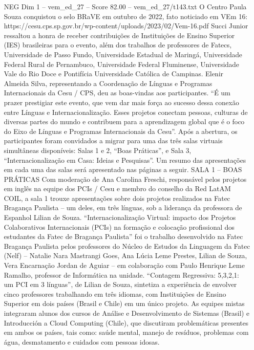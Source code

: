 \begin{textsample}{NEG Dim 1 – vem\_ed\_27 – Score 82.00 – vem\_ed\_27/t143.txt}
O Centro Paula Souza conquistou o selo BRaVE em outubro de 2022, fato noticiado em VEm 16: https://cesu.cps.sp.gov.br/wp-content/uploads/2023/02/Vem-16.pdf Succi Junior ressaltou a honra de receber contribuições de Instituições de Ensino Superior (IES) brasileiras para o evento, além dos trabalhos de professores de Fatecs, Universidade de Passo Fundo, Universidade Estadual de Maringá, Universidade Federal Rural de Pernambuco, Universidade Federal Fluminense, Universidade Vale do Rio Doce e Pontifícia Universidade Católica de Campinas.
Elenir Almeida Silva, representando a Coordenação de Línguas e Programas Internacionais da Cesu / CPS, deu as boas-vindas aos participantes. “É um prazer prestigiar este evento, que vem dar mais força ao sucesso dessa conexão entre Línguas e Internacionalização.
Esses projetos conectam pessoas, culturas de diversas partes do mundo e contribuem para a aprendizagem global que é o foco do Eixo de Línguas e Programas Internacionais da Cesu”.
Após a abertura, os participantes foram convidados a migrar para uma das três salas virtuais simultâneas disponíveis: Salas 1 e 2, “Boas Práticas”, e Sala 3, “Internacionalização em Casa: Ideias e Pesquisas”.
Um resumo das apresentações em cada uma das salas será apresentado nas páginas a seguir.
SALA 1 – BOAS PRÁTICAS Com moderação de Ana Carolina Freschi, responsável pelos projetos em inglês na equipe dos PCIs / Cesu e membro do conselho da Red LatAM COIL, a sala 1 trouxe apresentações sobre dois projetos realizados na Fatec Bragança Paulista – um deles, em três línguas, sob a liderança da professora de Espanhol Lilian de Souza. “Internacionalização Virtual: impacto dos Projetos Colaborativos Internacionais (PCIs) na formação e colocação profissional dos estudantes da Fatec de Bragança Paulista” foi o trabalho desenvolvido na Fatec Bragança Paulista pelos professores do Núcleo de Estudos da Linguagem da Fatec (Nelf) – Natalie Nara Mastrangi Goes, Ana Lúcia Leme Prestes, Lilian de Souza, Vera Encarnação Jordan de Aguiar – em colaboração com Paulo Henrique Leme Ramalho, professor de Informática na unidade. “Contagem Regressiva: 5,3,2,1: um PCI em 3 línguas”, de Lilian de Souza, sintetiza a experiência de envolver cinco professores trabalhando em três idiomas, com Instituições de Ensino Superior em dois países (Brasil e Chile) em um único projeto.
As equipes mistas integraram alunos dos cursos de Análise e Desenvolvimento de Sistemas (Brasil) e Introducción a Cloud Computing (Chile), que discutiram problemáticas presentes em ambos os países, tais como: saúde mental, manejo de resíduos, problemas com água, desmatamento e cuidados com pessoas idosas.

\end{textsample}

